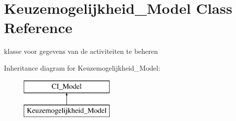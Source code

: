 \hypertarget{class_keuzemogelijkheid___model}{}\section{Keuzemogelijkheid\+\_\+\+Model Class Reference}
\label{class_keuzemogelijkheid___model}


klasse voor gegevens van de activiteiten te beheren  


Inheritance diagram for Keuzemogelijkheid\+\_\+\+Model\+:\begin{figure}[H]
\begin{center}
\leavevmode
\includegraphics[height=2.000000cm]{class_keuzemogelijkheid___model}
\end{center}
\end{figure}
